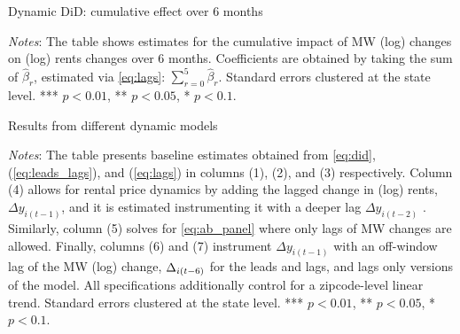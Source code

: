 
\begin{table}[h!]
	\caption{Dynamic DiD: cumulative effect over 6 months}
	\label{tab:dynamic_cumulative}
	\centering
	\resizebox{0.7\textwidth}{!}{
		\vspace{0pt}    
		
	}
	\begin{minipage}{.95\textwidth} \footnotesize
		\vspace{3mm} 
		\textit{Notes}: The table shows estimates for the cumulative impact of MW (log) changes 
		on (log) rents changes over 6 months. Coefficients are obtained by taking the sum of 
		$\hat{\beta}_{r}$, estimated via \autoref{eq:lags}: $\sum\limits_{r=0}^{5} \hat{\beta}_{r}$. 
		Standard errors clustered at the state level. *** $p < 0.01$, ** $p < 0.05$, * $p < 0.1$.   
	\end{minipage}
\end{table}

\clearpage
\begin{landscape}
	\begin{table}[h!]
	    \caption{Results from different dynamic models}
	    \label{tab:horse_race_main}
	    \centering
	    \resizebox{1.3\textwidth}{!}{
		    \vspace{0pt}    
		    
	    }
	    \begin{minipage}{1.25\textwidth} \footnotesize
			\vspace{3mm} 
			\textit{Notes}: The table presents baseline estimates obtained from \autoref{eq:did}, 
			(\ref{eq:leads_lags}), and (\ref{eq:lags}) in columns (1), (2), and (3) respectively. 
			Column (4) allows for rental price dynamics by adding the lagged change in (log) rents, 
			$\Delta y_{i(t-1)}$, and it is estimated instrumenting it with a deeper lag $\Delta 
			y_{i(t-2)}$ \parencite{arellano1991some}. Similarly, column (5) solves for 
			\autoref{eq:ab_panel} where only lags of MW changes are allowed. Finally, columns (6) and 
			(7) instrument $\Delta y_{i(t-1)}$ with an off-window lag of the MW (log) change, $\Delta 
			\title{MW}_{i(t-6)}$ for the leads and lags, and lags only versions of the model. All 
			specifications additionally control for a zipcode-level linear trend. Standard errors 
			clustered at the state level. *** $p < 0.01$, ** $p < 0.05$, * $p < 0.1$.   
		\end{minipage}
	\end{table}
\end{landscape}


